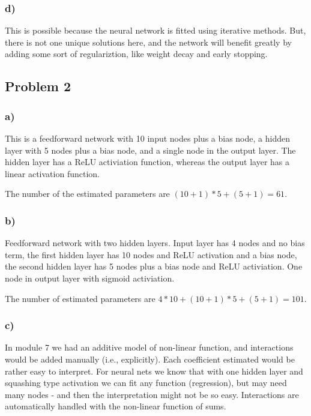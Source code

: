 \documentclass[
]{article}
\begin{document}
\hypertarget{d}{%
\subsubsection{d)}\label{d}}

This is possible because the neural network is fitted using iterative
methods. But, there is not one unique solutions here, and the network
will benefit greatly by adding some sort of regulariztion, like weight
decay and early stopping.

\hypertarget{problem-2}{%
\subsection{Problem 2}\label{problem-2}}

\hypertarget{a-1}{%
\subsubsection{a)}\label{a-1}}

This is a feedforward network with 10 input nodes plus a bias node, a
hidden layer with 5 nodes plus a bias node, and a single node in the
output layer. The hidden layer has a ReLU activiation function, whereas
the output layer has a linear activation function.

The number of the estimated parameters are \((10+1)*5+(5+1)=61\).

\hypertarget{b-1}{%
\subsubsection{b)}\label{b-1}}

Feedforward network with two hidden layers. Input layer has 4 nodes and
no bias term, the first hidden layer has 10 nodes and ReLU activation
and a bias node, the second hidden layer has 5 nodes plus a bias node
and ReLU activiation. One node in output layer with sigmoid activiation.

The number of estimated parameters are \(4*10+(10+1)*5+(5+1)=101\).

\hypertarget{c-1}{%
\subsubsection{c)}\label{c-1}}

In module 7 we had an additive model of non-linear function, and
interactions would be added manually (i.e., explicitly). Each
coefficient estimated would be rather easy to interpret. For neural nets
we know that with one hidden layer and squashing type activation we can
fit any function (regression), but may need many nodes - and then the
interpretation might not be so easy. Interactions are automatically
handled with the non-linear function of sums.
\end{document}
